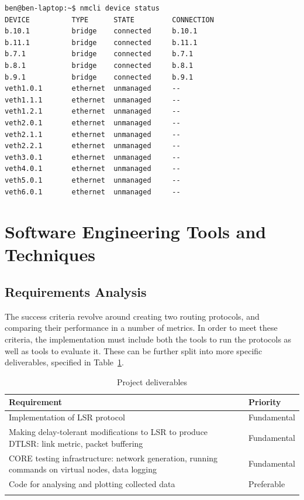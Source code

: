 \documentclass[withindex,glossary,openany]{cam-thesis}
\begin{document}
\begin{minipage}{1\textwidth} \centering
\begin{lstlisting}[label=core_interfaces, frame=tb, caption=Virtualised ethernet network interfaces (\texttt{veth}) are connected by bridges.]
ben@ben-laptop:~$ nmcli device status
DEVICE          TYPE      STATE         CONNECTION
b.10.1          bridge    connected     b.10.1
b.11.1          bridge    connected     b.11.1
b.7.1           bridge    connected     b.7.1
b.8.1           bridge    connected     b.8.1
b.9.1           bridge    connected     b.9.1
veth1.0.1       ethernet  unmanaged     --
veth1.1.1       ethernet  unmanaged     --
veth1.2.1       ethernet  unmanaged     --
veth2.0.1       ethernet  unmanaged     --
veth2.1.1       ethernet  unmanaged     --
veth2.2.1       ethernet  unmanaged     --
veth3.0.1       ethernet  unmanaged     --
veth4.0.1       ethernet  unmanaged     --
veth5.0.1       ethernet  unmanaged     --
veth6.0.1       ethernet  unmanaged     --
\end{lstlisting}
\end{minipage}

\section{Software Engineering Tools and Techniques}

\subsection{Requirements Analysis}

The success criteria revolve around creating two routing protocols, and comparing their performance in a number of metrics. In order to meet these criteria, the implementation must include both the tools to run the protocols as well as tools to evaluate it. These can be further split into more specific deliverables,
specified in Table~\ref{table:requirements}.

\begin{table}[H]
\begin{tabularx}{\textwidth}{Xl}
\hline
\textbf{Requirement} & \textbf{Priority} \\
\hline
Implementation of LSR protocol & Fundamental \\
Making delay-tolerant modifications to LSR to produce DTLSR: link metric, packet buffering & Fundamental \\
CORE testing infrastructure: network generation, running commands on virtual nodes, data logging & Fundamental \\
Code for analysing and plotting collected data & Preferable \\
 & \\
\hline
\end{tabularx}
\caption{Project deliverables}
\label{table:requirements}
\end{table}
\end{document}

